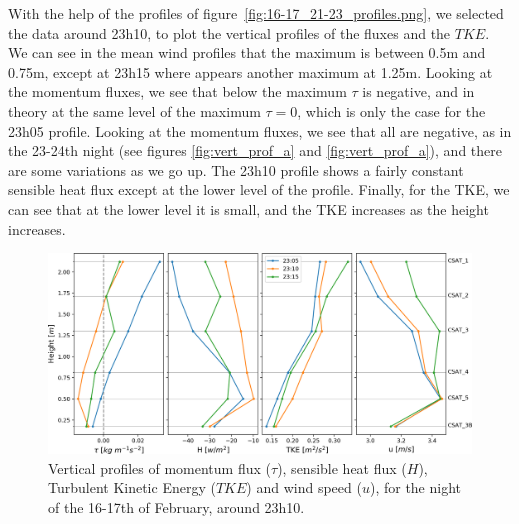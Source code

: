 With the help of the profiles of figure~\ref{fig:16-17_21-23_profiles.png}, we selected the data around 23h10, to plot the vertical profiles of the fluxes and the $TKE$. We can see in the mean wind profiles that the maximum is between 0.5m and 0.75m, except at 23h15 where appears another maximum at 1.25m. Looking at the momentum fluxes, we see that below the maximum $\tau$ is negative, and in theory at the same level of the maximum $\tau = 0$, which is only the case for the 23h05 profile. Looking at the momentum fluxes, we see that all are negative, as in the 23-24th night (see figures \ref{fig:vert_prof_a} and \ref{fig:vert_prof_a}), and there are some variations as we go up. The 23h10 profile shows a fairly constant sensible heat flux except at the lower level of the profile. Finally, for the TKE, we can see that at the lower level it is small, and the TKE increases as the height increases.

\begin{figure}
    \centering
    \includegraphics[width=1\textwidth]{fig/chapter_4/16-17/vert_prof_d_speedmax.png}
    \caption{Vertical profiles of momentum flux ($\tau$), sensible heat flux ($H$), Turbulent Kinetic Energy ($TKE$) and wind speed ($u$), for the night of the 16-17th of February, around 23h10.}
    \label{fig:vert_prof_d}
\end{figure}
